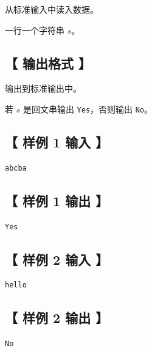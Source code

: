 \documentclass{statement}
\begin{document}
从标准输入中读入数据。

一行一个字符串 $s$。


\subsection[ 输出格式 ]{【 输出格式 】}

输出到标准输出中。

若 $s$ 是回文串输出 \texttt{Yes}，否则输出 \texttt{No}。


\subsection[ 样例 1 输入 ]{【 样例 1 输入 】}

\begin{verbatim}
abcba
\end{verbatim}


\subsection[ 样例 1 输出 ]{【 样例 1 输出 】}

\begin{verbatim}
Yes
\end{verbatim}


\subsection[ 样例 2 输入 ]{【 样例 2 输入 】}

\begin{verbatim}
hello
\end{verbatim}


\subsection[ 样例 2 输出 ]{【 样例 2 输出 】}

\begin{verbatim}
No
\end{verbatim}
\end{document}
